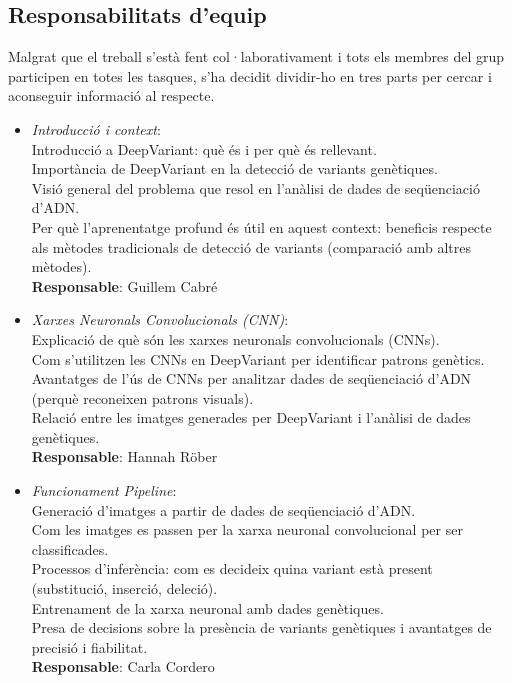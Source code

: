 \documentclass[a4paper]{article}
\begin{document}
	\subsection{Responsabilitats d'equip}
	Malgrat que el treball s'està fent col·laborativament i tots els membres del grup participen en totes les tasques, s'ha decidit dividir-ho en tres parts per cercar i aconseguir informació al respecte.
	\begin{itemize}
		\item \emph{Introducció i context}:\\
		Introducció a DeepVariant: què és i per què és rellevant.\\
		Importància de DeepVariant en la detecció de variants genètiques.\\
		Visió general del problema que resol en l'anàlisi de dades de seqüenciació d'ADN.\\
		Per què l'aprenentatge profund és útil en aquest context: beneficis respecte als mètodes tradicionals de detecció de variants (comparació amb altres mètodes).\\
		\textbf{Responsable}: Guillem Cabré\\
		
		\item \emph{Xarxes Neuronals Convolucionals (CNN)}:\\
		Explicació de què són les xarxes neuronals convolucionals (CNNs).\\
		Com s'utilitzen les CNNs en DeepVariant per identificar patrons genètics.\\
		Avantatges de l'ús de CNNs per analitzar dades de seqüenciació d'ADN (perquè reconeixen patrons visuals).\\
		Relació entre les imatges generades per DeepVariant i l'anàlisi de dades genètiques.\\
		\textbf{Responsable}: Hannah Röber\\
		
		\item \emph{Funcionament Pipeline}:\\
		Generació d'imatges a partir de dades de seqüenciació d'ADN.\\
		Com les imatges es passen per la xarxa neuronal convolucional per ser classificades.\\
		Processos d'inferència: com es decideix quina variant està present (substitució, inserció, deleció).\\
		Entrenament de la xarxa neuronal amb dades genètiques.\\
		Presa de decisions sobre la presència de variants genètiques i avantatges de precisió i fiabilitat.\\
		\textbf{Responsable}: Carla Cordero\\
	\end{itemize}
	
\end{document}
